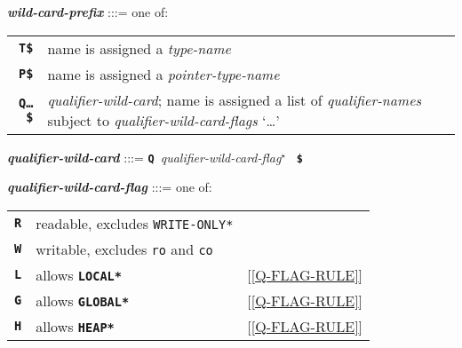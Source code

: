 \documentclass[12pt]{article}
\newcommand{\TT}[1]{{\tt \bfseries #1}}
\newcommand{\STAR}{{\Large $^\star$}}
\newcommand{\ttkey}[1]{{\tt \bfseries #1}}
\newcommand{\emkey}[1]{{\em \bfseries #1}}
\newenvironment{indpar}[1][0.3in]%
	{\begin{list}{}%
		     {\setlength{\itemsep}{0in}%
		      \setlength{\topsep}{0in}%
		      \setlength{\parsep}{1ex}%
		      \setlength{\labelwidth}{#1}%
		      \setlength{\leftmargin}{#1}%
		      \addtolength{\leftmargin}{\labelsep}}%
	 \item}%
	{\end{list}}
\begin{document}
\begin{indpar}
\emkey{wild-card-prefix}\label{WILD-CARD-PREFIX} :::= one of: \\
\hspace*{0.2in}\begin{tabular}{rp{4in}}
\ttkey{T\$} & name is assigned a {\em type-name} \\
\ttkey{P\$} & name is assigned a {\em pointer-type-name} \\
\ttkey{Q\ldots\$} & {\em qualifier-wild-card}; name is assigned a
                    list of {\em qualifier-names} subject to
		    {\em qualifier-wild-card-flags} `\ldots'\\
\end{tabular}

\emkey{qualifier-wild-card}\label{QUALIFIER-WILD-CARD} :::=
    \TT{Q}~{\em qualifier-wild-card-flag}\STAR{}~ \TT{\$}

\emkey{qualifier-wild-card-flag}\label{QUALIFIER-WILD-FLAG} :::= one of: \\
\hspace*{0.2in}\begin{tabular}{rll}
\ttkey{R} & readable, excludes {\tt *WRITE-ONLY*} \\
\ttkey{W} & writable, excludes {\tt ro} and {\tt co} \\
\ttkey{L} & allows \TT{*LOCAL*}  & [\ref{Q-FLAG-RULE}] \\
\ttkey{G} & allows \TT{*GLOBAL*} & [\ref{Q-FLAG-RULE}] \\
\ttkey{H} & allows \TT{*HEAP*}   & [\ref{Q-FLAG-RULE}] \\
\end{tabular}
\end{indpar}
\end{document}
